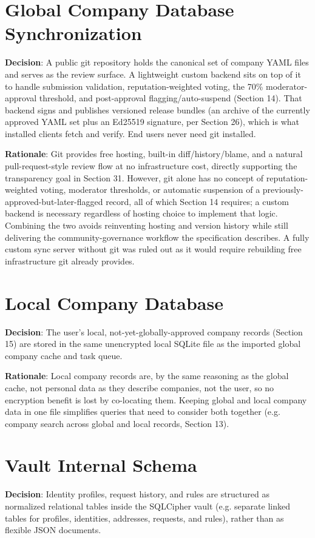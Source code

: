 \section{Global Company Database Synchronization}
\textbf{Decision}:  A public git repository holds the canonical set of company YAML files and serves as the review surface. A lightweight custom backend sits on top of it to handle submission validation, reputation-weighted voting, the 70\% moderator-approval threshold, and post-approval flagging/auto-suspend (Section 14). That backend signs and publishes versioned release bundles (an archive of the currently approved YAML set plus an Ed25519 signature, per Section 26), which is what installed clients fetch and verify. End users never need git installed.

\textbf{Rationale}:  Git provides free hosting, built-in diff/history/blame, and a natural pull-request-style review flow at no infrastructure cost, directly supporting the transparency goal in Section 31. However, git alone has no concept of reputation-weighted voting, moderator thresholds, or automatic suspension of a previously-approved-but-later-flagged record, all of which Section 14 requires; a custom backend is necessary regardless of hosting choice to implement that logic. Combining the two avoids reinventing hosting and version history while still delivering the community-governance workflow the specification describes. A fully custom sync server without git was ruled out as it would require rebuilding free infrastructure git already provides.
\section{Local Company Database}
\textbf{Decision}:  The user's local, not-yet-globally-approved company records (Section 15) are stored in the same unencrypted local SQLite file as the imported global company cache and task queue.

\textbf{Rationale}:  Local company records are, by the same reasoning as the global cache, not personal data as they describe companies, not the user, so no encryption benefit is lost by co-locating them. Keeping global and local company data in one file simplifies queries that need to consider both together (e.g. company search across global and local records, Section 13).
\section{Vault Internal Schema}
\textbf{Decision}:  Identity profiles, request history, and rules are structured as normalized relational tables inside the SQLCipher vault (e.g. separate linked tables for profiles, identities, addresses, requests, and rules), rather than as flexible JSON documents.

